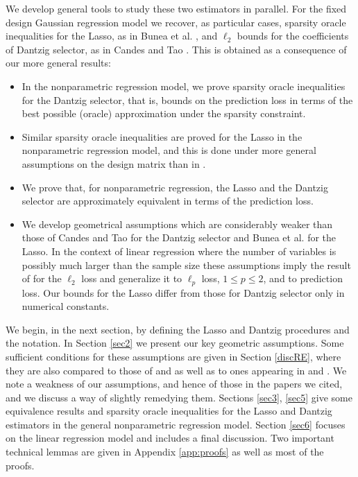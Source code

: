 \documentclass[dvips,aos]{imsart}
\numberwithin{equation}{section}
\theoremstyle{plain}
\begin{document}
We develop general tools to study these two estimators in parallel.
For the fixed design Gaussian regression model we recover, as
particular cases, sparsity oracle inequalities for the Lasso, as in
Bunea et al. \cite{btw07}, and $\ell_2$ bounds for the coefficients
of Dantzig selector, as in Candes and Tao \cite{ct07}. This is
obtained as a consequence of our more general results:
\begin{itemize}
\item  In the nonparametric regression model, we prove sparsity oracle
    inequalities for the Dantzig
    selector, that is, bounds on the prediction loss in terms of
    the best possible (oracle) approximation under the sparsity
    constraint.
\item Similar sparsity oracle inequalities are proved for the Lasso in
    the nonparametric regression model, and this is done under more
    general assumptions on the design matrix than in \cite{btw07}.
\item We prove that, for nonparametric regression, the Lasso and  the
    Dantzig selector are approximately equivalent in terms of the
    prediction loss.
\item We develop geometrical assumptions which are considerably weaker
    than those of Candes and Tao \cite{ct07} for the Dantzig selector and
    Bunea et al.\cite{btw07} for the Lasso. In the context of linear
    regression where the number of variables is possibly much larger than
    the sample size these assumptions imply the result of \cite{ct07} for
    the $\ell_2$ loss and generalize it to $\ell_p$ loss, $1\leq p\leq2$,
    and to prediction loss. Our bounds for the Lasso differ from those
    for Dantzig selector only in numerical constants.
\end{itemize}
We begin, in the next section, by defining the Lasso and Dantzig
procedures and the notation.  In Section \ref{sec2} we present our
key geometric assumptions. Some sufficient conditions for these
assumptions are given in Section \ref{discRE}, where they are also
compared to those of \cite{ct07} and \cite{my06} as well as to ones
appearing in \cite{btw07} and \cite{btw06b}. We  note a weakness of
our assumptions, and hence of those in the papers we cited, and we
discuss a way of slightly remedying them. Sections \ref{sec3},
\ref{sec5} give some equivalence results and sparsity oracle
inequalities for the Lasso and Dantzig estimators in the general
nonparametric regression model. Section \ref{sec6} focuses on the
linear regression model and includes a final discussion. Two
important technical lemmas are given in Appendix \ref{app:proofs} as
well as most of the proofs.
\end{document}
